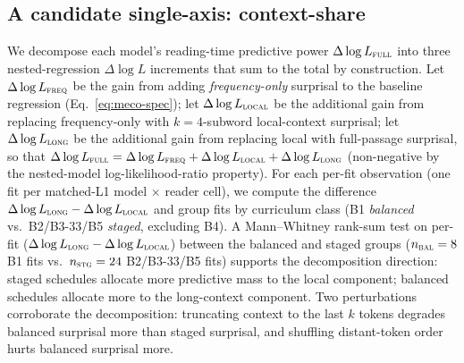 \subsection{A candidate single-axis: context-share}\label{sec:context-share-app}

We decompose each model's reading-time predictive power $\Delta\log L_\textsc{full}$ into three nested-regression $\Delta\log L$ increments that sum to the total by construction. Let $\Delta\log L_\textsc{freq}$ be the gain from adding \emph{frequency-only} surprisal to the baseline regression (Eq.~\ref{eq:meco-spec}); let $\Delta\log L_\textsc{local}$ be the additional gain from replacing frequency-only with $k{=}4$-subword local-context surprisal; let $\Delta\log L_\textsc{long}$ be the additional gain from replacing local with full-passage surprisal, so that $\Delta\log L_\textsc{full} = \Delta\log L_\textsc{freq} + \Delta\log L_\textsc{local} + \Delta\log L_\textsc{long}$ (non-negative by the nested-model log-likelihood-ratio property). For each per-fit observation (one fit per matched-L1 model $\times$ reader cell), we compute the difference $\Delta\log L_\textsc{long} - \Delta\log L_\textsc{local}$ and group fits by curriculum class (B1 \emph{balanced} vs.\ B2/B3-33/B5 \emph{staged}, excluding B4). A Mann--Whitney rank-sum test on per-fit ($\Delta\log L_\textsc{long} - \Delta\log L_\textsc{local}$) between the balanced and staged groups ($n_{\textsc{bal}}=8$ B1 fits vs.\ $n_{\textsc{stg}}=24$ B2/B3-33/B5 fits) supports the decomposition direction: staged schedules allocate more predictive mass to the local component; balanced schedules allocate more to the long-context component. Two perturbations corroborate the decomposition: truncating context to the last $k$ tokens degrades balanced surprisal more than staged surprisal, and shuffling distant-token order hurts balanced surprisal more.

